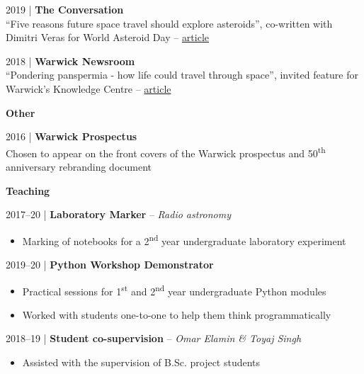 \documentclass[10pt,a4paper]{altacv}
\begin{document}
\smallskip

\small 2019 | \textbf{The Conversation} \\
``Five reasons future space travel should explore asteroids'', co-written with Dimitri Veras for World Asteroid Day -- \href{https://theconversation.com/five-reasons-future-space-travel-should-explore-asteroids-119246}{article}

\smallskip

\small 2018 | \textbf{Warwick Newsroom} \\
``Pondering panspermia - how life could travel through space'', invited feature for Warwick's Knowledge Centre -- \href{https://warwick.ac.uk/newsandevents/knowledgecentre/science/physics-astrophysics/panspermia}{article}

\divider

\normalsize \textbf{Other}

\medskip

\small 2016 | \textbf{Warwick Prospectus} \\
Chosen to appear on the front covers of the Warwick prospectus and 50\textsuperscript{th} anniversary rebranding document

\medskip



\normalsize \textbf{Teaching}

\medskip

\small 2017--20 | \textbf{Laboratory Marker} -- \textit{Radio astronomy} \\
\smallskip
\begin{itemize}
	\item Marking of notebooks for a 2\textsuperscript{nd} year undergraduate laboratory experiment
\end{itemize}

\smallskip

\small 2019--20 | \textbf{Python Workshop Demonstrator} \\
\smallskip
\begin{itemize}
	\item Practical sessions for 1\textsuperscript{st} and 2\textsuperscript{nd} year undergraduate Python modules
	\item Worked with students one-to-one to help them think programmatically
\end{itemize}

\smallskip

\small 2018--19 | \textbf{Student co-supervision} -- \textit{Omar Elamin \& Toyaj Singh} \\
\smallskip
\begin{itemize}
	\item Assisted with the supervision of B.Sc. project students
\end{itemize}
\end{document}
